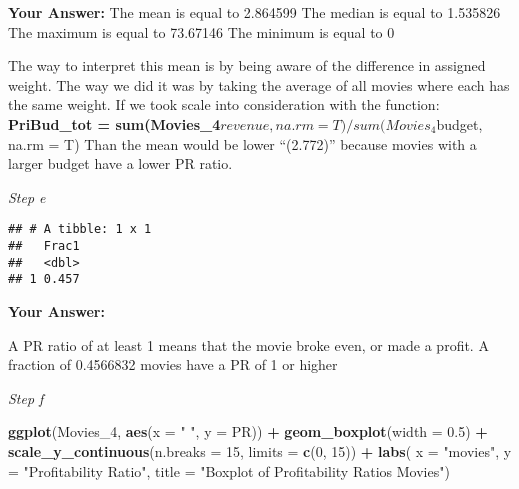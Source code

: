 \documentclass[
]{article}
\newenvironment{Shaded}{\begin{snugshade}}{\end{snugshade}}
\newcommand{\AttributeTok}[1]{\textcolor[rgb]{0.13,0.29,0.53}{#1}}
\newcommand{\DecValTok}[1]{\textcolor[rgb]{0.00,0.00,0.81}{#1}}
\newcommand{\FloatTok}[1]{\textcolor[rgb]{0.00,0.00,0.81}{#1}}
\newcommand{\FunctionTok}[1]{\textcolor[rgb]{0.13,0.29,0.53}{\textbf{#1}}}
\newcommand{\NormalTok}[1]{#1}
\newcommand{\SpecialCharTok}[1]{\textcolor[rgb]{0.81,0.36,0.00}{\textbf{#1}}}
\newcommand{\StringTok}[1]{\textcolor[rgb]{0.31,0.60,0.02}{#1}}
\begin{document}
\textbf{Your Answer:} The mean is equal to 2.864599 The median is equal
to 1.535826 The maximum is equal to 73.67146 The minimum is equal to 0

The way to interpret this mean is by being aware of the difference in
assigned\\
weight. The way we did it was by taking the average of all movies where
each has the same weight. If we took scale into consideration with the
function: \textbf{PriBud\_tot =
sum(Movies\_4}\(revenue, na.rm = T) / sum(Movies_4\)budget, na.rm = T)
Than the mean would be lower ``(2.772)'' because movies with a larger
budget have a lower PR ratio.

\emph{Step e}

\begin{Shaded}
\end{Shaded}

\begin{verbatim}
## # A tibble: 1 x 1
##   Frac1
##   <dbl>
## 1 0.457
\end{verbatim}

\textbf{Your Answer:}

A PR ratio of at least 1 means that the movie broke even, or made a
profit. A fraction of 0.4566832 movies have a PR of 1 or higher

\emph{Step f}

\begin{Shaded}
\begin{Highlighting}[]
\FunctionTok{ggplot}\NormalTok{(Movies\_4, }\FunctionTok{aes}\NormalTok{(}\AttributeTok{x =} \StringTok{" "}\NormalTok{, }\AttributeTok{y =}\NormalTok{ PR)) }\SpecialCharTok{+}
  \FunctionTok{geom\_boxplot}\NormalTok{(}\AttributeTok{width =} \FloatTok{0.5}\NormalTok{) }\SpecialCharTok{+} 
  \FunctionTok{scale\_y\_continuous}\NormalTok{(}\AttributeTok{n.breaks =} \DecValTok{15}\NormalTok{, }\AttributeTok{limits =} \FunctionTok{c}\NormalTok{(}\DecValTok{0}\NormalTok{, }\DecValTok{15}\NormalTok{)) }\SpecialCharTok{+}
  \FunctionTok{labs}\NormalTok{(}
    \AttributeTok{x =} \StringTok{"movies"}\NormalTok{,  }
    \AttributeTok{y =} \StringTok{"Profitability Ratio"}\NormalTok{,}
    \AttributeTok{title =} \StringTok{"Boxplot of Profitability Ratios Movies"}\NormalTok{)}
\end{Highlighting}
\end{Shaded}
\end{document}
